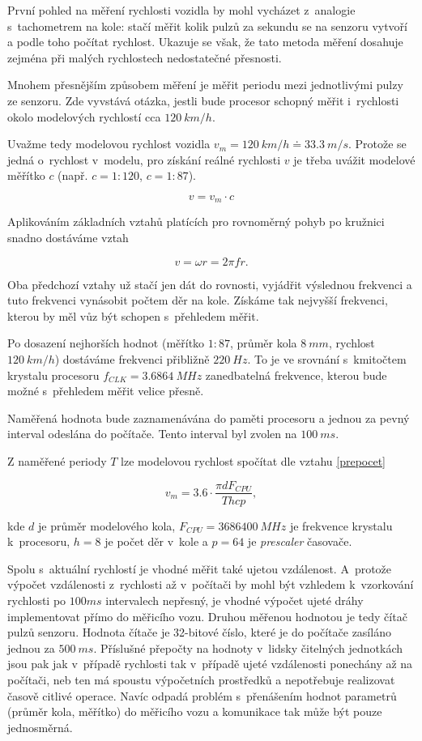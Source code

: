 První pohled na měření rychlosti vozidla by mohl vycházet z~analogie
s~tachometrem na kole: stačí měřit kolik pulzů za sekundu se na senzoru vytvoří
a podle toho počítat rychlost. Ukazuje se však, že tato metoda měření dosahuje
zejména při malých rychlostech nedostatečné přesnosti.

Mnohem přesnějším způsobem měření je měřit periodu mezi jednotlivými pulzy ze
senzoru. Zde vyvstává otázka, jestli bude procesor schopný měřit i~rychlosti
okolo modelových rychlostí cca $120\ km/h$.

Uvažme tedy modelovou rychlost vozidla $v_m = 120\ km/h \doteq 33.3\ m/s$.
Protože se jedná o~rychlost v~modelu, pro získání reálné rychlosti $v$ je třeba
uvážit modelové měřítko $c$ (např. $c = 1:120$, $c = 1:87$).

$$v = v_m \cdot c$$

Aplikováním základních vztahů platících pro rovnoměrný pohyb po kružnici snadno
dostáváme vztah

$$v = \omega r = 2 \pi f r.$$

Oba předchozí vztahy už stačí jen dát do rovnosti, vyjádřit výslednou frekvenci
a tuto frekvenci vynásobit počtem děr na kole. Získáme tak nejvyšší frekvenci,
kterou by měl vůz být schopen s~přehledem měřit.

Po dosazení nejhorších hodnot (měřítko $1:87$, průměr kola $8\ mm$, rychlost
$120\ km/h$) dostáváme frekvenci přibližně $220\ Hz$. To je ve srovnání
s~kmitočtem krystalu procesoru $f_{CLK} = 3.6864\ MHz$ zanedbatelná frekvence,
kterou bude možné s~přehledem měřit velice přesně.

Naměřená hodnota bude zaznamenávána do paměti procesoru a jednou za pevný
interval odeslána do počítače. Tento interval byl zvolen na $100\ ms$.

Z naměřené periody $T$ lze modelovou rychlost spočítat dle vztahu
\ref{prepocet}

\begin{equation}
v_m = 3.6 \cdot \frac{\pi d F_{CPU}}{T h c p},
\label{prepocet}
\end{equation}

kde $d$ je průměr modelového kola, $F_{CPU} = 3686400\ MHz$ je frekvence
krystalu k~procesoru, $h = 8$ je počet děr v~kole a $p = 64$ je
\textit{prescaler} časovače.

Spolu s~aktuální rychlostí je vhodné měřit také ujetou vzdálenost. A~protože
výpočet vzdálenosti z~rychlosti až v~počítači by mohl být vzhledem k~vzorkování
rychlosti po $100 ms$ intervalech nepřesný, je vhodné výpočet ujeté dráhy
implementovat přímo do měřicího vozu. Druhou měřenou hodnotou je tedy čítač
pulzů senzoru. Hodnota čítače je 32-bitové číslo, které je do počítače zasíláno
jednou za $500\ ms$. Příslušné přepočty na hodnoty v~lidsky čitelných
jednotkách jsou pak jak v~případě rychlosti tak v~případě ujeté vzdálenosti
ponechány až na počítači, neb ten má spoustu výpočetních prostředků a
nepotřebuje realizovat časově citlivé operace. Navíc odpadá problém
s~přenášením hodnot parametrů (průměr kola, měřítko) do měřicího vozu a
komunikace tak může být pouze jednosměrná.

